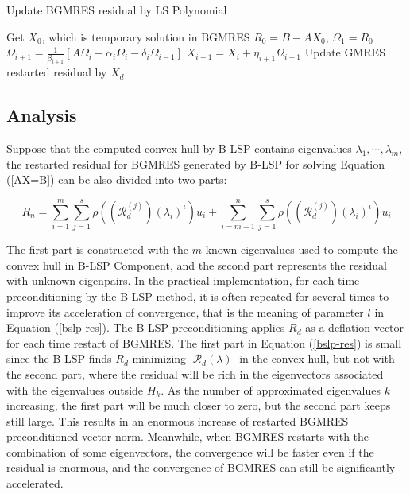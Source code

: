 \begin{algorithm}[htbp]{}
	\caption{Update BGMRES residual by LS Polynomial}   
	\label{alg:LSUpdateResidual}   
	\begin{algorithmic}[1]
		\State Get $X_0$, which is temporary solution in BGMRES
		\State $R_0=B-AX_0$, $\Omega_1 = R_0$
		\State $\Omega_{i+1}=\frac{1}{\beta_{i+1}}[A\Omega_i-\alpha_i\Omega_i-\delta_i\Omega_{i-1}]$
		\State $X_{i+1}=X_i+\eta_{i+1}\Omega_{i+1}$
		\EndFor
		\EndFor
		\State Update GMRES restarted residual by $X_{d}$
		\EndFunction
	\end{algorithmic}  
\end{algorithm}

\subsection{Analysis}

Suppose that the computed convex hull by B-LSP contains eigenvalues $\lambda_1,\cdots, \lambda_m$, the restarted residual for BGMRES generated by B-LSP for solving Equation (\ref{AX=B})  can be also divided into two parts:

\begin{equation}
\label{bslp-res}
R_n = \sum_{i=1}^{m}\sum_{j=1}^{s}\rho((\mathcal{R}_d^{(j)})(\lambda_i)^{\iota})u_i + \sum_{i=m+1}^{n}\sum_{j=1}^{s}\rho((\mathcal{R}_d^{(j)})(\lambda_i)^{\iota})u_i
\end{equation}


The first part is constructed with the $m$ known eigenvalues used to compute the convex hull in B-LSP Component, and the second part represents the residual with unknown eigenpairs. In the practical implementation, for each time preconditioning by the B-LSP method, it is often repeated for several times to improve its acceleration of convergence, that is the meaning of parameter $l$ in Equation (\ref{bslp-res}). The B-LSP preconditioning applies $R_d$ as a deflation vector for each time restart of BGMRES. The first part in Equation (\ref{bslp-res}) is small since the B-LSP finds $R_d$ minimizing $|\mathcal{R}_d(\lambda)|$ in the convex hull, but not with the second part, where the residual will be rich in the eigenvectors associated with the eigenvalues outside $H_k$. As the number of approximated eigenvalues $k$ increasing, the first part will be much closer to zero, but the second part keeps still large. This results in an enormous increase of restarted BGMRES preconditioned vector norm. Meanwhile, when BGMRES restarts with the combination of some eigenvectors, the convergence will be faster even if the residual is enormous, and the convergence of BGMRES can still be significantly accelerated.

